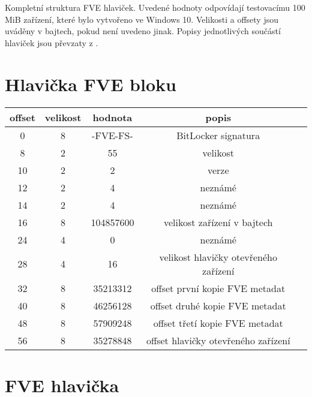 
\listofappendices

\label{attachment:metadata}

Kompletní struktura FVE hlaviček. Uvedené hodnoty odpovídají testovacímu 100 MiB zařízení, které bylo vytvořeno ve Windows 10. Velikosti a offsety jsou uváděny v bajtech, pokud není uvedeno jinak. Popisy jednotlivých součástí hlaviček jsou převzaty z \cite{Metz2011}.

\section*{Hlavička FVE bloku}

\begin{table}[h]
\begin{center}
\centering
\begin{tabular}{|c|c|c|c|c|}
  \hline
   \textbf{offset} & \textbf{velikost} & \textbf{hodnota} & \textbf{popis} \\ \hline
   0 & 8 & -FVE-FS- & BitLocker signatura \\ \hline
   8 & 2 & 55 & velikost \\ \hline
   10 & 2 & 2 & verze \\ \hline
   12 & 2 & 4 & neznámé \\ \hline
   14 & 2 & 4 & neznámé \\ \hline
   16 & 8 & 104857600 & velikost zařízení v bajtech \\ \hline
   24 & 4 & 0 & neznámé \\ \hline
   28 & 4 & 16 & velikost hlavičky otevřeného zařízení \\ \hline
   32 & 8 & 35213312 & offset první kopie FVE metadat \\ \hline
   40 & 8 & 46256128 & offset druhé kopie FVE metadat \\ \hline
   48 & 8 & 57909248 & offset třetí kopie FVE metadat \\ \hline
   56 & 8 & 35278848 & offset hlavičky otevřeného zařízení \\ \hline
\end{tabular}
\end{center}
\end{table}

\section*{FVE hlavička}

